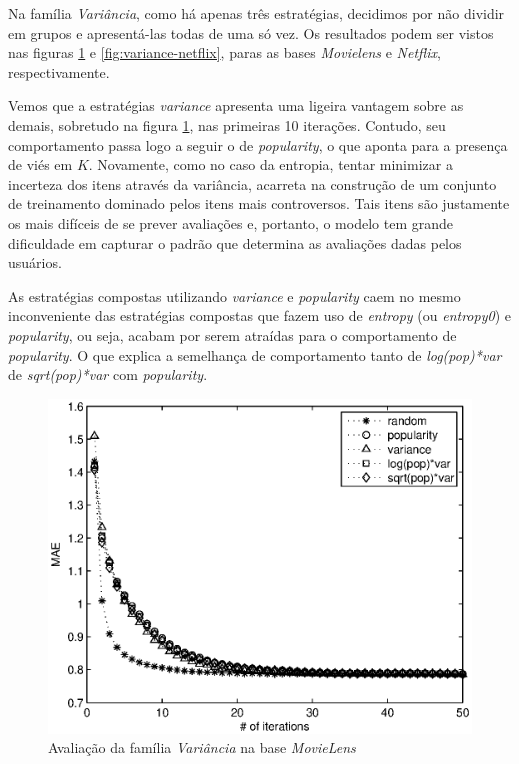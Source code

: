 Na família \textit{Variância}, como há apenas três estratégias, decidimos por não dividir em grupos e apresentá-las todas de uma só vez. Os resultados podem ser vistos nas figuras \ref{fig:variance-movielens} e \ref{fig:variance-netflix}, paras as bases \textit{Movielens} e \textit{Netflix}, respectivamente.

Vemos que a estratégias \textit{variance} apresenta uma ligeira vantagem sobre as demais, sobretudo na figura \ref{fig:variance-movielens}, nas primeiras 10 iterações. Contudo, seu comportamento passa logo a seguir o de \textit{popularity}, o que aponta para a presença de viés em $K$. Novamente, como no caso da entropia, tentar minimizar a incerteza dos itens através da variância, acarreta na construção de um conjunto de treinamento dominado pelos itens mais controversos. Tais itens são justamente os mais difíceis de se prever avaliações e, portanto, o modelo tem grande dificuldade em capturar o padrão que determina as avaliações dadas pelos usuários.  

As estratégias compostas utilizando \textit{variance} e \textit{popularity} caem no mesmo inconveniente das estratégias compostas que fazem uso de \textit{entropy} (ou \textit{entropy0}) e \textit{popularity}, ou seja, acabam por serem atraídas para o comportamento de \textit{popularity}. O que explica a semelhança de comportamento tanto de \textit{log(pop)*var} de \textit{sqrt(pop)*var} com \textit{popularity}.

\begin{figure}[ht]
\centering
\includegraphics{ml_variance_family.eps}
\caption{Avaliação da família \textit{Variância} na base \textit{MovieLens}}
\label{fig:variance-movielens}
\end{figure}

